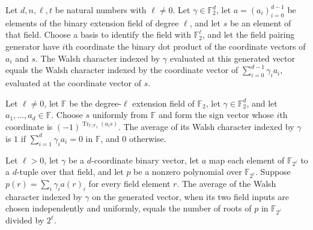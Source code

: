 \begin{theorem}
\label{FABL.vectorWalshCharacter_fieldPairingGenerator}
\leanok
{}
Let $d,n,\ell,t$ be natural numbers with $\ell\ne0$. Let $\gamma\in\mathbb F_2^d$, let
$a=(a_i)_{i=0}^{d-1}$ be elements of the binary extension field of degree $\ell$, and
let $s$ be an element of that field. Choose a basis to identify the field with $\mathbb
F_2^\ell$, and let the field pairing generator have $i$th coordinate the binary dot
product of the coordinate vectors of $a_i$ and $s$. The Walsh character indexed by
$\gamma$ evaluated at this generated vector equals the Walsh character indexed by the
coordinate vector of $\sum_{i=0}^{d-1}\gamma_i a_i$, evaluated at the coordinate vector
of $s$.
\end{theorem}

\begin{theorem}
\label{FABL.expect_fieldPairingGenerator}
\leanok
{}
Let $\ell\neq 0$, let $\mathbb F$ be the degree-$\ell$ extension field of $\mathbb F_2$,
let $\gamma\in\mathbb F_2^d$, and let $a_1,\ldots,a_d\in\mathbb F$. Choose $s$ uniformly
from $\mathbb F$ and form the sign vector whose $i$th coordinate is
$(-1)^{\operatorname{Tr}_{\mathbb F/\mathbb F_2}(a_i s)}$. The average of its Walsh
character indexed by $\gamma$ is $1$ if $\sum_{i=1}^d\gamma_i a_i=0$ in $\mathbb F$, and
$0$ otherwise.
\end{theorem}

\begin{theorem}
\label{FABL.fieldPairingGenerator_characterExpectation_eq_rootProbability}
\leanok
{}
Let $\ell>0$, let $\gamma$ be a $d$-coordinate binary vector, let $a$ map each element
of $\mathbb F_{2^\ell}$ to a $d$-tuple over that field, and let $p$ be a nonzero
polynomial over $\mathbb F_{2^\ell}$. Suppose $p(r)=\sum_i\gamma_i a(r)_i$ for every
field element $r$. The average of the Walsh character indexed by $\gamma$ on the
generated vector, when its two field inputs are chosen independently and uniformly,
equals the number of roots of $p$ in $\mathbb F_{2^\ell}$ divided by $2^\ell$.
\end{theorem}

